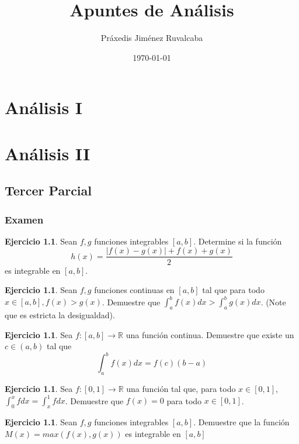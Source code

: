 \documentclass[11pt,a4paper,oneside]{report}
\title{Apuntes de Análisis}
\author{Práxedis Jiménez Ruvalcaba}
\date{\today}
\theoremstyle{definition}
\newtheorem{ejercicio}[definicion]{Ejercicio}
\theoremstyle{plain}
\theoremstyle{remark}
\newcommand{\R}{\mathbb{R}}
\begin{document}
\maketitle
\tableofcontents

\part{Análisis I}



\part{Análisis II}

\chapter{Tercer Parcial}

\section{Examen}

\begin{ejercicio}
Sean $f,g$ funciones integrables $[a,b]$. Determine si la función 
\[ h (x) =\frac{|f(x)-g(x)|+f(x)+g(x)}{2} \]
es integrable en $[a,b]$.
\end{ejercicio}

\begin{ejercicio}
Sean $f,g$ funciones continuas en $[a,b]$ tal que para todo $x\in[a,b],f(x)>g(x)$. 
Demuestre que $\int_{a}^{b}f(x) dx > \int_{a}^{b}g(x) dx$. (Note que es estricta la desigualdad).
\end{ejercicio}

\begin{ejercicio}
Sea $f:[a,b]\rightarrow \R$ una función continua. Demuestre que existe un $c\in (a,b)$ tal que
\[ \int_{a}^{b}f(x)dx=f(c)(b-a)\]
\end{ejercicio}

\begin{ejercicio}
Sea $f:[0,1]\rightarrow \R$ una función tal que, para todo $x\in[0,1]$, 
$\int_{0}^{x}f dx = \int_{x}^{1}f dx$. Demuestre que $f(x)=0$ para todo
$x \in [0,1]$.
\end{ejercicio}

\begin{ejercicio}
Sean $f,g$ funciones integrables $[a,b]$. Demuestre que la función 
$M(x)=max(f(x),g(x))$ es integrable en $[a,b]$
\end{ejercicio}
\end{document}
